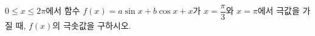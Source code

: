$0\le x\le 2\pi$에서 함수 $f(x)=a\sin x+b\cos x+x$가 $x=\dfrac{\pi}{3}$와 $x=\pi$에서 극값을 가질 때, $f(x)$의 극솟값을 구하시오. 
